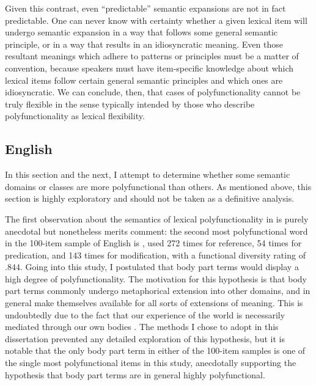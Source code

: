 Given this contrast, even \enquote{predictable} semantic expansions are not in fact predictable. One can never know with certainty whether a given lexical item will undergo semantic expansion in a way that follows some general semantic principle, or in a way that results in an idiosyncratic meaning. Even those resultant meanings which adhere to patterns or principles must be a matter of convention, because speakers must have item-specific knowledge about which lexical items follow certain general semantic principles and which ones are idiosyncratic. We can conclude, then, that cases of polyfunctionality cannot be truly flexible in the sense typically intended by those who describe polyfunctionality as lexical flexibility.

\subsection{English}
\label{sec:4.6.2}

In this section and the next, I attempt to determine whether some semantic domains or classes are more polyfunctional than others. As mentioned above, this section is highly exploratory and should not be taken as a definitive analysis.

The first observation about the semantics of lexical polyfunctionality in  is purely anecdotal but nonetheless merits comment: the second most polyfunctional word in the 100-item sample of English is , used 272 times for reference, 54 times for predication, and 143 times for modification, with a functional diversity rating of $.844$. Going into this study, I postulated that body part terms would display a high degree of polyfunctionality. The motivation for this hypothesis is that body part terms commonly undergo metaphorical extension into other domains, and in general make themselves available for all sorts of extensions of meaning. This is undoubtedly due to the fact that our experience of the world is necessarily mediated through our own bodies \parencite{LakoffJohnson1980}. The methods I chose to adopt in this dissertation prevented any detailed exploration of this hypothesis, but it is notable that the only body part term in either of the 100-item samples is one of the single most polyfunctional items in this study, anecdotally supporting the hypothesis that body part terms are in general highly polyfunctional.

